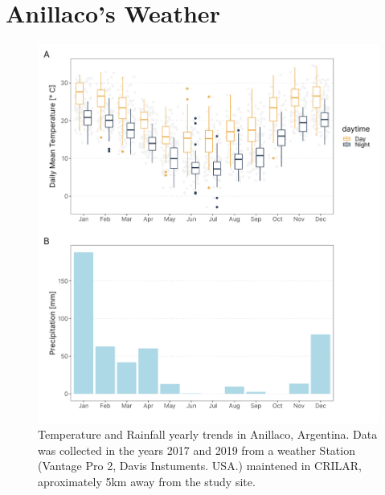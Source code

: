 \documentclass[english,msc,numbers,hidelinks]{coppe}
\begin{document}
  \hypertarget{anillacos-weather}{%
  \section{Anillaco's Weather}\label{anillacos-weather}}
  \begin{figure}[H]

  {\centering \includegraphics[width=1\linewidth]{../04_figures/appendix/plot_weather} 

  }

  \caption{Temperature  and Rainfall yearly trends in Anillaco, Argentina. Data was collected in the years 2017 and 2019 from a weather Station (Vantage Pro 2, Davis Instuments. USA.) maintened in CRILAR, aproximately 5km away from the study site.}\label{fig:appendix-weather}
  \end{figure}
  \pagebreak
\end{document}

